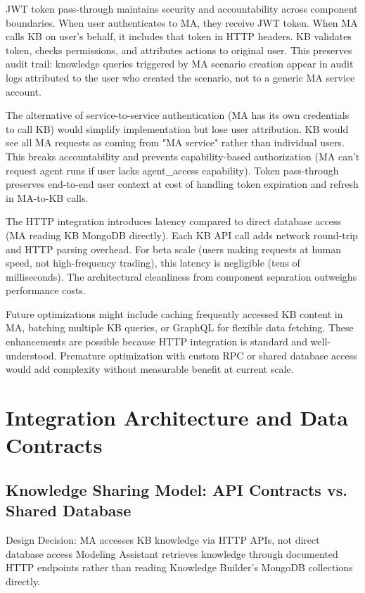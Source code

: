 \documentclass[12pt,a4paper]{article}
\begin{document}
JWT token pass-through maintains security and accountability across component boundaries. When user authenticates to MA, they receive JWT token. When MA calls KB on user's behalf, it includes that token in HTTP headers. KB validates token, checks permissions, and attributes actions to original user. This preserves audit trail: knowledge queries triggered by MA scenario creation appear in audit logs attributed to the user who created the scenario, not to a generic MA service account.

The alternative of service-to-service authentication (MA has its own credentials to call KB) would simplify implementation but lose user attribution. KB would see all MA requests as coming from "MA service" rather than individual users. This breaks accountability and prevents capability-based authorization (MA can't request agent runs if user lacks agent\_access capability). Token pass-through preserves end-to-end user context at cost of handling token expiration and refresh in MA-to-KB calls.

The HTTP integration introduces latency compared to direct database access (MA reading KB MongoDB directly). Each KB API call adds network round-trip and HTTP parsing overhead. For beta scale (users making requests at human speed, not high-frequency trading), this latency is negligible (tens of milliseconds). The architectural cleanliness from component separation outweighs performance costs.

Future optimizations might include caching frequently accessed KB content in MA, batching multiple KB queries, or GraphQL for flexible data fetching. These enhancements are possible because HTTP integration is standard and well-understood. Premature optimization with custom RPC or shared database access would add complexity without measurable benefit at current scale.

\section{Integration Architecture and Data Contracts}

\subsection{Knowledge Sharing Model: API Contracts vs. Shared Database}

\begin{rationale}{Design Decision: MA accesses KB knowledge via HTTP APIs, not direct database access}
Modeling Assistant retrieves knowledge through documented HTTP endpoints rather than reading Knowledge Builder's MongoDB collections directly.
\end{rationale}
\end{document}
